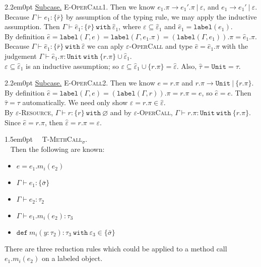 \documentclass{llncs}
\newcommand{\keywadj}[1]{\mathtt{#1}}
\newcommand{\keyw}[1]{\keywadj{#1}~}
\newcommand{\proofcase}[2]{
	\begin{adjustwidth}{1.5em}{0pt}
		\fbox{Case.}~~#1. \\ ~#2
	\end{adjustwidth}
}
\newcommand{\subcase}[1] {
	\begin{adjustwidth}{2.2em}{0pt}
		\underline{Subcase.} #1
	\end{adjustwidth}
}
\newcommand{\type}[2]{
	#1~\keyw{with} #2
}
\begin{document}
{{	\subcase{\textsc{E-OperCall1}.
		Then we know $e_1.\pi \longrightarrow e_1'.\pi~|~\varepsilon$, and $e_1 \rightarrow e_1'~|~\varepsilon$. Because $\Gamma \vdash e_1 : \{ \bar r \}$ by assumption of the typing rule, we may apply the inductive assumption. Then $\Gamma \vdash \hat e_1 : \type{\{ \bar r \}}{\hat \varepsilon_1$, where $\varepsilon \subseteq \hat \varepsilon_1$ and $\hat e_1 = \keywadj{label}(e_1)$.\\

\noindent
By definition $\hat e = \keywadj{label}(\Gamma, e) = \keywadj{label}(\Gamma, e_1.\pi) = (\keywadj{label}(\Gamma, e_1)).\pi = \hat e_1.\pi$. Because $\Gamma \vdash \hat e_1 : \type{\{ \bar r \}}{\hat \varepsilon}$ we can aply \textsc{$\varepsilon$-OperCall} and type $\hat e = \hat e_1.\pi$ with the judgement $\Gamma \vdash \hat e_1.\pi : \type{\keywadj{Unit}}{\{ r.\pi \} \cup \hat \varepsilon_1}$. \\

\noindent
$\varepsilon \subseteq \hat \varepsilon_1$ is an inductive assumption; so $\varepsilon \subseteq \hat \varepsilon_1 \cup \{ r.\pi \} = \hat \varepsilon$. Also, $\hat \tau = \keywadj{Unit} = \tau$.\\
		}
	}
	
	\subcase{\textsc{E-OperCall2}.
		Then we know $e = r.\pi$ and $r.\pi \longrightarrow \keywadj{Unit}~|~\{ r.\pi \}$. By definition $\hat e = \keywadj{label}(\Gamma, e) = (\keywadj{label}(\Gamma, r)).\pi = r.\pi = e$, so $\hat e = e$. Then $\hat \tau = \tau$ automatically. We need only show $\varepsilon = r.\pi \in \hat \varepsilon$.\\
		
\noindent
By \textsc{$\varepsilon$-Resource}, $\Gamma \vdash r : \type{ \{ r \} }{\varnothing}$ and by \textsc{$\varepsilon$-OperCall}, $\Gamma \vdash r.\pi : \type{\keywadj{Unit}}{\{ r.\pi \}}$. Since $\hat e = r.\pi$, then $\hat \varepsilon = r.\pi = \varepsilon$.\\
	}
}

\proofcase{\textsc{T-MethCall$_\sigma$}}{
Then the following are known:
\begin{itemize}
	\item $e = e_1.m_i(e_2)$
	\item $\Gamma \vdash e_1 : \{ \bar \sigma \}$
	\item $\Gamma \vdash e_2 : \tau_2$
	\item $\Gamma \vdash e_1.m_i(e_2) : \tau_3$
	\item $\keywadj{def}~m_i(y:\tau_2) : \type{\tau_3}{\varepsilon_3} \in \{ \bar \sigma \}$
\end{itemize}
There are three reduction rules which could be applied to a method call $e_1.m_i(e_2)$ on a labeled object.\\

}}
\end{document}
